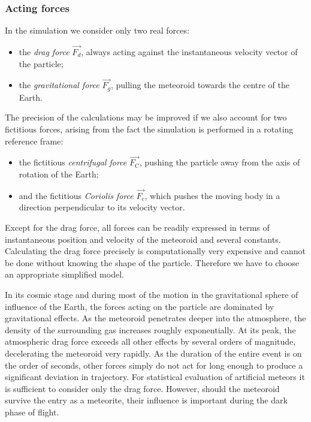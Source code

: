         \subsubsection{Acting forces} \label{saia}
            In the simulation we consider only two real forces:
            \begin{itemize}
                \item the \emph{drag force} $\vec{F_d}$, always acting against the instantaneous velocity vector of the particle;
                \item the \emph{gravitational force} $\vec{F_g}$, pulling the meteoroid towards the centre of the Earth.
            \end{itemize}

            The precision of the calculations may be improved if we also account for two fictitious forces,
            arising from the fact the simulation is performed in a rotating reference frame:
            \begin{itemize}
                \item the fictitious \emph{centrifugal force} $\vec{F_{\mathrm{C}}}$,
                    pushing the particle away from the axis of rotation of the Earth;
                \item and the fictitious \emph{Coriolis force} $\vec{F_{\mathrm{c}}}$,
                    which pushes the moving body in a direction perpendicular to its velocity vector.
            \end{itemize}

            Except for the drag force, all forces can be readily expressed in terms of instantaneous
            position and velocity of the meteoroid and several constants.
            Calculating the drag force precisely is computationally very expensive and cannot be done
            without knowing the shape of the particle. Therefore we have to choose an appropriate simplified model.

            In its cosmic stage and during most of the motion in the gravitational sphere of influence of the Earth,
            the forces acting on the particle are dominated by gravitational effects. As the meteoroid penetrates
            deeper into the atmosphere, the density of the surrounding gas increases roughly exponentially.
            At its peak, the atmospheric drag force exceeds all other effects by several orders of magnitude,
            decelerating the meteoroid very rapidly.
            As the duration of the entire event is on the order of seconds, other forces simply do not act for long enough
            to produce a significant deviation in trajectory. For statistical evaluation of artificial meteors
            it is sufficient to consider only the drag force.
            However, should the meteoroid survive the entry as a meteorite, their influence is important during the dark phase of flight.

